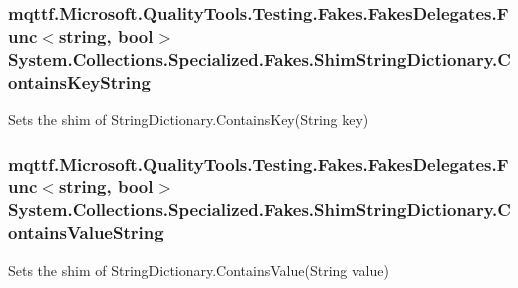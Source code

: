 \hypertarget{class_system_1_1_collections_1_1_specialized_1_1_fakes_1_1_shim_string_dictionary_ac2700c3aced88eca21a5224769f75c84}{
\subsubsection[{Contains\-Key\-String}]{\setlength{\rightskip}{0pt plus 5cm}mqttf.\-Microsoft.\-Quality\-Tools.\-Testing.\-Fakes.\-Fakes\-Delegates.\-Func$<$string, bool$>$ System.\-Collections.\-Specialized.\-Fakes.\-Shim\-String\-Dictionary.\-Contains\-Key\-String\hspace{0.3cm}{\ttfamily [set]}}}\label{class_system_1_1_collections_1_1_specialized_1_1_fakes_1_1_shim_string_dictionary_ac2700c3aced88eca21a5224769f75c84}


Sets the shim of String\-Dictionary.\-Contains\-Key(\-String key)

\hypertarget{class_system_1_1_collections_1_1_specialized_1_1_fakes_1_1_shim_string_dictionary_afdb5b8f1a32957d3a9f79dc2bbaf22fb}{
\subsubsection[{Contains\-Value\-String}]{\setlength{\rightskip}{0pt plus 5cm}mqttf.\-Microsoft.\-Quality\-Tools.\-Testing.\-Fakes.\-Fakes\-Delegates.\-Func$<$string, bool$>$ System.\-Collections.\-Specialized.\-Fakes.\-Shim\-String\-Dictionary.\-Contains\-Value\-String\hspace{0.3cm}{\ttfamily [set]}}}\label{class_system_1_1_collections_1_1_specialized_1_1_fakes_1_1_shim_string_dictionary_afdb5b8f1a32957d3a9f79dc2bbaf22fb}


Sets the shim of String\-Dictionary.\-Contains\-Value(\-String value)

